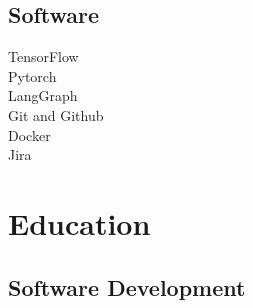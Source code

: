\documentclass[letterpaper]{deedy-resume} %
\begin{document}
\begin{minipage}[t]{0.33\textwidth}


\sectionspace %


\sectionspace %

\subsection{Software}
TensorFlow \\
Pytorch \\
LangGraph \\
Git and Github \\
Docker \\
Jira \\


\sectionspace %


\section{Education} 

\subsection{Software Development}


\end{minipage}
\end{document}
